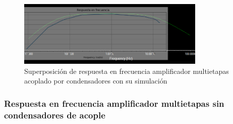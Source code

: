 \begin{figure}[ht]
    \centering
    \includegraphics[width=0.8\textwidth]{src/images/resultados/p4/superposicion respuesta en frecuencia con condensadores.png}
    \caption{Superposición de respuesta en frecuencia amplificador multietapas acoplado por condensadores con su simulación}
    \label{fig:superposicion-respuesta-frecuencia-amplificador-multietapas-acoplado-condensadores}
\end{figure}

\subsubsection{Respuesta en frecuencia amplificador multietapas sin condensadores de acople}

